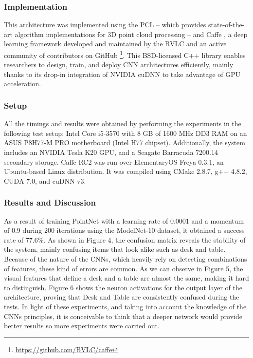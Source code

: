 \subsubsection{Implementation}

This architecture was implemented using the \ac{PCL} \cite{Rusu2011}\cite{Aldoma2012} – which provides state-of-the-art algorithm implementations for 3D point cloud processing – and Caffe \cite{Jia2014}, a deep learning framework developed and maintained by the \ac{BVLC} and an active community of contributors on GitHub \footnote{\url{https://github.com/BVLC/caffe}}. This BSD-licensed C++ library enables researchers to design, train, and deploy \ac{CNN} architectures efficiently, mainly thanks to its drop-in integration of NVIDIA cuDNN \cite{Chetlur2014} to take advantage of \ac{GPU} acceleration.


\subsubsection{Setup}

All the timings and results were obtained by performing the experiments in the following test setup: Intel Core i5-3570 with 8 GB of 1600 MHz DD3 RAM on an ASUS P8H77-M PRO motherboard (Intel H77 chipset). Additionally, the system includes an NVIDIA Tesla K20 GPU, and a Seagate Barracuda 7200.14 secondary storage. Caffe RC2 was run over ElementaryOS Freya 0.3.1, an Ubuntu-based Linux distribution. It was compiled using CMake 2.8.7, g++ 4.8.2, CUDA 7.0, and cuDNN v3.

\subsubsection{Results and Discussion}
\label{cha:objrecog:sec:pointnet:subsec:discussion}

As a result of training PointNet with a learning rate of 0.0001 and a momentum of 0.9 during 200 iterations using the ModelNet-10 dataset, it obtained a success rate of $77.6$\%. As shown in Figure 4, the confusion matrix reveals the stability of the system, mainly confusing items that look alike such as desk and table. Because of the nature of the \acp{CNN}, which heavily rely on detecting combinations of features, these kind of errors are common. As we can observe in Figure 5, the visual features that define a desk and a table are almost the same, making it hard to distinguish. Figure 6 shows the neuron activations for the output layer of the architecture, proving that Desk and Table are consistently confused during the tests. In light of these experiments, and taking into account the knowledge of the \acp{CNN} principles, it is conceivable to think that a deeper network would provide better results so more experiments were carried out.

